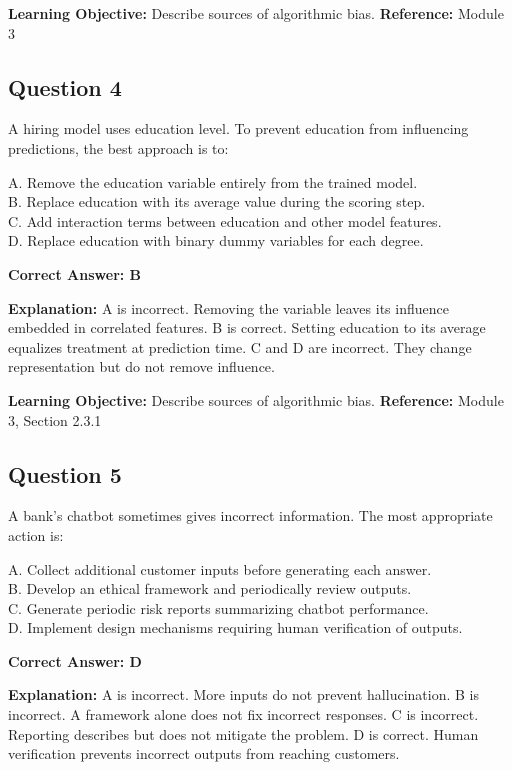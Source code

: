 \documentclass[11pt]{article}
\begin{document}
	\textbf{Learning Objective:} Describe sources of algorithmic bias.
	\textbf{Reference:} Module 3
	
	\subsection*{Question 4}
	A hiring model uses education level. To prevent education from
	influencing predictions, the best approach is to:
	
	A. Remove the education variable entirely from the trained model.\\
	B. Replace education with its average value during the scoring step.\\
	C. Add interaction terms between education and other model features.\\
	D. Replace education with binary dummy variables for each degree.
	
	\vspace{0.4em}
	\textbf{Correct Answer: B}
	
	\textbf{Explanation:}
	A is incorrect. Removing the variable leaves its influence embedded in
	correlated features.
	B is correct. Setting education to its average equalizes treatment at
	prediction time.
	C and D are incorrect. They change representation but do not remove
	influence.
	
	\textbf{Learning Objective:} Describe sources of algorithmic bias.
	\textbf{Reference:} Module 3, Section 2.3.1
	
	\subsection*{Question 5}
	A bank's chatbot sometimes gives incorrect information. The most
	appropriate action is:
	
	A. Collect additional customer inputs before generating each answer.\\
	B. Develop an ethical framework and periodically review outputs.\\
	C. Generate periodic risk reports summarizing chatbot performance.\\
	D. Implement design mechanisms requiring human verification of outputs.
	
	\vspace{0.4em}
	\textbf{Correct Answer: D}
	
	\textbf{Explanation:}
	A is incorrect. More inputs do not prevent hallucination.
	B is incorrect. A framework alone does not fix incorrect responses.
	C is incorrect. Reporting describes but does not mitigate the problem.
	D is correct. Human verification prevents incorrect outputs from reaching
	customers.
	
\end{document}
